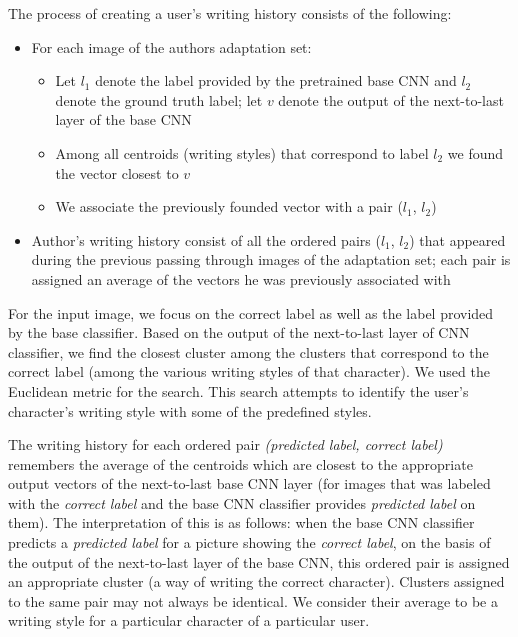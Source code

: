 \documentclass{article}
\begin{document}
The process of creating a user's writing history consists of the following: %
\begin{itemize}
  \item For each image of the authors adaptation set: 
  \begin{itemize}
    \item Let $l_1$ denote the label provided by the pretrained base CNN and $l_2$ denote the ground truth label; 
    let $v$ denote the output of the next-to-last layer of the base CNN 
    \item Among all centroids (writing styles) that correspond to label $l_2$ we found the vector closest to $v$
    \item We associate the previously founded vector with a pair ($l_1$, $l_2$)
  \end{itemize}
  \item Author's writing history consist of all the ordered pairs ($l_1$, $l_2$) that appeared during the previous passing through images of the adaptation set; 
  each pair is assigned an average of the vectors he was previously associated with
  
\end{itemize}

For the input image, we focus on the correct label as well as the label provided by the base classifier.
Based on the output of the next-to-last layer of CNN classifier, we find the closest cluster among the clusters that correspond to the correct label (among the various writing styles of that character).
We used the Euclidean metric for the search. %
This search attempts to identify the user's character's writing style with some of the predefined styles.

The writing history for each ordered pair \textit{(predicted label, correct label)} remembers the average of the centroids 
which are closest to the appropriate output vectors of the next-to-last base CNN layer 
(for images that was labeled with the \textit{correct label} and the base CNN classifier provides \textit{predicted label} on them). 
The interpretation of this is as follows: when the base CNN classifier predicts %
 a \textit{predicted label} for a picture showing the \textit{correct label},
on the basis of the output of the next-to-last layer of the base CNN, this ordered pair is assigned an appropriate cluster (a way of writing the correct character). %
Clusters assigned to the same pair may not always be identical.
We consider their average to be a writing style for a particular character of a particular user.
\end{document}
